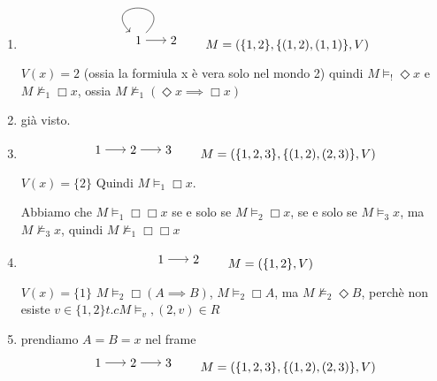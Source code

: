 \documentclass[../main.tex]{subfiles}
\begin{document}
\begin{enumerate}
    \item \begin{equation*}
              \begin{tikzpicture}[->]
                  \node (1) {1};
                  \node (2) [right of=1] {2};
                  \path
                  (1) edge[loop] node {} (1)
                  (1) edge node {} (2);
              \end{tikzpicture}
              \qquad
              M = (\{1,2\},\{(1,2),(1,1)\}, V)
          \end{equation*}

          $V(x) = 2 $ (ossia la formiula x è vera solo nel mondo 2) quindi $M \vDash_! \Diamond x$ e $M \nvDash_1 \Box x$, ossia $M \nvDash_1 (\Diamond x \implies \Box x)$
    \item già visto.
    \item \begin{equation*}
              \begin{tikzpicture}[->]
                  \node (1) {1};
                  \node (2) [right of=1] {2};
                  \node (3) [right of=2] {3};
                  \path
                  (1) edge node {} (2)
                  (2) edge node {} (3);
              \end{tikzpicture}
              \qquad
              M = (\{1,2,3\},\{(1,2),(2,3)\}, V)
          \end{equation*}

          $V(x) = \{2\}$ Quindi $M \vDash_1 \Box x$.

          Abbiamo che $M \vDash_1 \Box \Box x$ se e solo se $M \vDash_2 \Box x$, se e solo se $M \vDash_3 x$, ma $M \nvDash_3 x$, quindi $M \nvDash_1 \Box \Box x$
    \item \begin{equation*}
              \begin{tikzpicture}[->]
                  \node (1) {1};
                  \node (2) [right of=1] {2};
                  \path
                  (1) edge node {} (2);
              \end{tikzpicture}
              \qquad
              M = (\{1,2\}, V)
          \end{equation*}

          $V(x) = \{1\}$ $M \vDash_2 \Box (A \implies B)$, $M \vDash_2 \Box A$, ma $M \nvDash_2 \Diamond B$, perchè non esiste $v \in \{1,2\} t.c M \vDash_v , (2,v) \in R$
    \item prendiamo $A = B = x$ nel frame
          \begin{equation*}
              \begin{tikzpicture}[->]
                  \node (1) {1};
                  \node (2) [right of=1] {2};
                  \node (3) [right of=2] {3};
                  \path
                  (1) edge node {} (2)
                  (2) edge node {} (3);
              \end{tikzpicture}
              \qquad
              M = (\{1,2,3\},\{(1,2),(2,3)\}, V)
          \end{equation*}


\end{enumerate}
\end{document}
